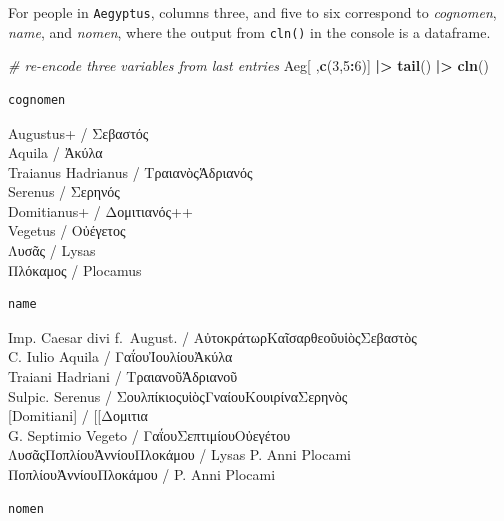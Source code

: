 \documentclass[a4paper,11pt]{memoir}
\newenvironment{Shaded}{\begin{snugshade}}{\end{snugshade}}
\newcommand{\CommentTok}[1]{\textcolor[rgb]{0.56,0.35,0.01}{\textit{#1}}}
\newcommand{\DecValTok}[1]{\textcolor[rgb]{0.00,0.00,0.81}{#1}}
\newcommand{\ErrorTok}[1]{\textcolor[rgb]{0.64,0.00,0.00}{\textbf{#1}}}
\newcommand{\KeywordTok}[1]{\textcolor[rgb]{0.13,0.29,0.53}{\textbf{#1}}}
\newcommand{\NormalTok}[1]{#1}
\newcommand{\OperatorTok}[1]{\textcolor[rgb]{0.81,0.36,0.00}{\textbf{#1}}}
\newcommand{\StringTok}[1]{\textcolor[rgb]{0.31,0.60,0.02}{#1}}
\begin{document}
For people in \texttt{Aegyptus}, columns three, and five to six
correspond to \emph{cognomen}, \emph{name}, and \emph{nomen}, where the
output from \texttt{cln()} in the console is a dataframe.

\begin{Shaded}
\begin{Highlighting}[]
\CommentTok{# re-encode three variables from last entries}
\NormalTok{Aeg[ ,}\KeywordTok{c}\NormalTok{(}\DecValTok{3}\NormalTok{,}\DecValTok{5}\OperatorTok{:}\DecValTok{6}\NormalTok{)] }\OperatorTok{|}\ErrorTok{>}\StringTok{ }
\StringTok{  }\KeywordTok{tail}\NormalTok{() }\OperatorTok{|}\ErrorTok{>}\StringTok{ }
\StringTok{  }\KeywordTok{cln}\NormalTok{()}
\end{Highlighting}
\end{Shaded}

\begin{verbatim}
cognomen
\end{verbatim}

\noindent
Augustus+ / Σεβαστός \\
Aquila / Ἀκύλα \\
Traianus Hadrianus / ΤραιανὸςἉδριανός \\
Serenus / Σερηνός \\
Domitianus+ / Δομιτιανός++ \\
Vegetus / Οὐέγετος \\
Λυσᾶς / Lysas \\
Πλόκαμος / Plocamus\\


\begin{verbatim}
name
\end{verbatim}

\noindent
Imp. Caesar divi f.~August. / ΑὐτοκράτωρΚαῖσαρθεοῦυἱὸςΣεβαστὸς \\
C. Iulio Aquila / ΓαΐουἸουλίουἈκύλα \\
Traiani Hadriani / ΤραιανοῦἉδριανοῦ \\
Sulpic. Serenus / ΣουλπίκιοςυἱὸςΓναίουΚουιρίναΣερηνὸς \\
{[}Domitiani{]} / {[}{[}Δομιτια \\
G. Septimio Vegeto / ΓαΐουΣεπτιμίουΟὐεγέτου\\
ΛυσᾶςΠοπλίουἈννίουΠλοκάμου / Lysas P. Anni Plocami \\
ΠοπλίουἈννίουΠλοκάμου / P. Anni Plocami\\

\begin{verbatim}
nomen
\end{verbatim}
\end{document}
